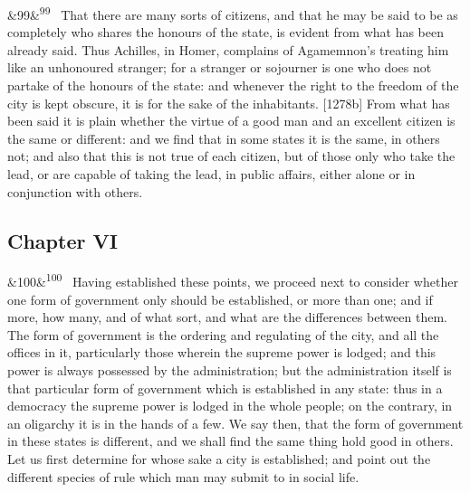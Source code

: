\documentclass[12pt]{article}
\newcommand{\para}[1][]{\par\noindent\ifx&#1&\else\textsuperscript{\footnotesize #1}~\fi}
\begin{document}
\para[99] That there are many sorts of citizens, and that he may be said to be as completely who shares the honours of the state, is evident from what has been already said. Thus Achilles, in Homer, complains of Agamemnon's treating him like an unhonoured stranger; for a stranger or sojourner is one who does not partake of the honours of the state: and whenever the right to the freedom of the city is kept obscure, it is for the sake of the inhabitants. [1278b] From what has been said it is plain whether the virtue of a good man and an excellent citizen is the same or different: and we find that in some states it is the same, in others not; and also that this is not true of each citizen, but of those only who take the lead, or are capable of taking the lead, in public affairs, either alone or in conjunction with others.

\subsection*{Chapter VI}

\para[100] Having established these points, we proceed next to consider whether one form of government only should be established, or more than one; and if more, how many, and of what sort, and what are the differences between them. The form of government is the ordering and regulating of the city, and all the offices in it, particularly those wherein the supreme power is lodged; and this power is always possessed by the administration; but the administration itself is that particular form of government which is established in any state: thus in a democracy the supreme power is lodged in the whole people; on the contrary, in an oligarchy it is in the hands of a few. We say then, that the form of government in these states is different, and we shall find the same thing hold good in others. Let us first determine for whose sake a city is established; and point out the different species of rule which man may submit to in social life.
\end{document}
